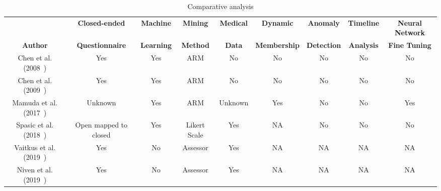 \begin{landscape}
    \begin{table}[htbp]
        \caption{Comparative analysis}
        \label{tab:TBL_Comparative_Analisys}
        \centering
        \small
        \setlength\tabcolsep{2pt}
        \begin{tabular}{|c|c|c|c|c|c|c|c|c|}
            \hline
                                                          & \textbf{Closed-ended}  & \textbf{Machine}  & \textbf{Mining} & \textbf{Medical} & \textbf{Dynamic}    & \textbf{Anomaly}   & \textbf{Timeline} & \textbf{Neural Network} \\
            \textbf{Author}                               & \textbf{Questionnaire} & \textbf{Learning} & \textbf{Method} & \textbf{Data}    & \textbf{Membership} & \textbf{Detection} & \textbf{Analysis} & \textbf{Fine Tuning}    \\
            \hline
            Chen et al. (2008~\cite{chen2008mining})      & Yes                    & Yes               & ARM             & No               & No                  & No                 & No                & No                      \\
            \hline
            Chen et al. (2009~\cite{chen2009mining})      & Yes                    & Yes               & ARM             & No               & No                  & No                 & No                & No                      \\
            \hline
            Mamuda et al. (2017~\cite{mamuda2017fusion})  & Unknown                & Yes               & ARM             & Unknown          & Yes                 & No                 & No                & Yes                     \\
            \hline
            Spasic et al. (2018~\cite{spasic2018closing}) & Open mapped to closed  & Yes               & Likert Scale    & Yes              & NA                  & No                 & No                & No                      \\
            \hline
            Vaitkus et al. (2019~\cite{vaitkus2019kamst}) & Yes                    & No                & Assessor        & Yes              & NA                  & NA                 & NA                & NA                      \\
            \hline
            Niven et al. (2019~\cite{niven2019cigarette}) & Yes                    & No                & Assessor        & Yes              & NA                  & NA                 & NA                & NA                      \\

\end{tabular}
\end{table}
\end{landscape}
